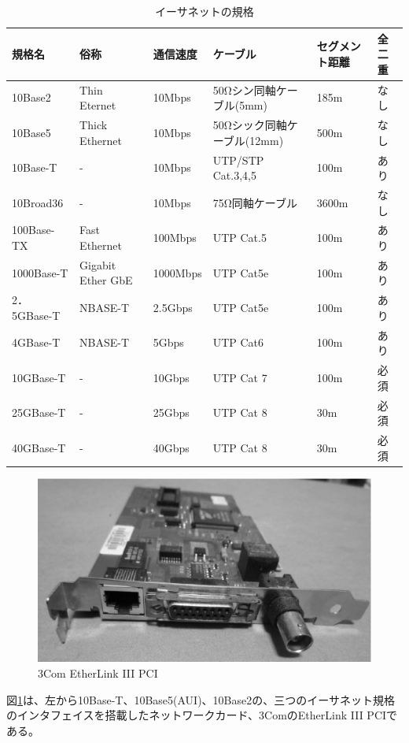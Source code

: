\begin{table}[htbp]  \label{ethernet}
\begin{center}
\begin{tabularx}{110mm}{XXXXXX} \toprule
規格名 & 俗称 & 通信速度 & ケーブル & セグメント距離 & 全二重\\ \midrule
10Base2 & Thin Eternet & 10Mbps & 50Ωシン同軸ケーブル(5mm) & 185m & なし \\
10Base5 & Thick Ethernet & 10Mbps & 50Ωシック同軸ケーブル(12mm) & 500m & なし \\
10Base-T &- & 10Mbps & UTP/STP Cat.3,4,5 & 100m & あり\\
10Broad36 & - &10Mbps & 75Ω同軸ケーブル & 3600m & なし\\
100Base-TX & Fast Ethernet & 100Mbps & UTP Cat.5 & 100m & あり\\
1000Base-T &Gigabit Ether GbE & 1000Mbps & UTP Cat5e & 100m & あり\\
2．5GBase-T & NBASE-T & 2.5Gbps & UTP Cat5e & 100m & あり\\
4GBase-T & NBASE-T & 5Gbps & UTP Cat6 & 100m & あり\\
10GBase-T & - & 10Gbps & UTP Cat 7 & 100m & 必須\\
25GBase-T & - & 25Gbps & UTP Cat 8 & 30m & 必須\\
40GBase-T & - & 40Gbps & UTP Cat 8 & 30m & 必須\\ \bottomrule
\end{tabularx}
\end{center} \caption{イーサネットの規格}
\end{table}

\begin{figure}[htbp]
	\includegraphics[width=12cm,clip]{draw/3com.eps}
	\caption{3Com EtherLink III PCI}
	\label{fig:3com}
\end{figure}

図\ref{fig:3com}は、左から10Base-T、10Base5(AUI)、10Base2の、三つのイーサネット規格のインタフェイスを搭載したネットワークカード、3ComのEtherLink III PCIである。

